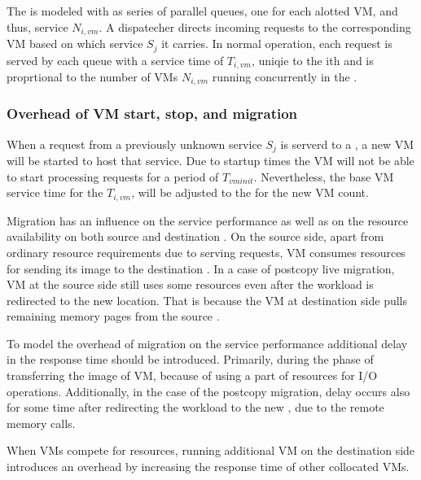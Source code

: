 The \dc{} is modeled with as series of parallel queues, one for each alotted VM, and thus, service $N_{i,vm}$. A dispatecher directs incoming requests to the corresponding VM based on which service $S_j$ it carries. In normal operation, each request is served by each queue with a service time of $T_{i,vm}$, uniqie to the ith \dc{} and is proprtional to the number of VMs $N_{i,vm}$ running concurrently in the \dc{}. %

\subsubsection{Overhead of VM start, stop, and migration}
When a request from a previously unknown service $S_j$ is serverd to a \dc{}, a new VM will be started to host that service. Due to startup times the VM will not be able to start processing requests for a period of $T_{vm init}$. Nevertheless, the base VM service time for the \dc{} $T_{i,vm}$, will be adjusted to the for the new VM count.

Migration has an influence on the service performance as well as on the resource availability on both source and destination \dc{}.
On the source side, apart from ordinary resource requirements due to serving requests, VM consumes resources for sending its image to the destination \dc{}.
In a case of postcopy live migration, VM at the source side still uses some resources even after the workload is redirected to the new location.
That is because the VM at destination side pulls remaining memory pages from the source \dc{}.


To model the overhead of migration on the service performance additional delay in the response time should be introduced.
Primarily, during the phase of transferring the image of VM, because of using a part of resources for I/O operations.
Additionally, in the case of the postcopy migration, delay occurs also for some time after redirecting the workload to the new \dc{}, due to the remote memory calls.

When VMs compete for resources, running additional VM on the destination side introduces an overhead by increasing the response time of other collocated VMs.

